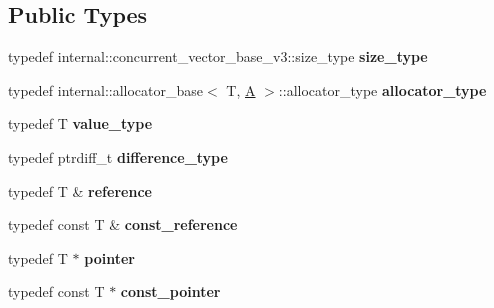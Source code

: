 \subsection*{Public Types}
\begin{DoxyCompactItemize}
\item 
\hypertarget{classtbb_1_1concurrent__vector_a3c7cfa676613fd96c89f2e4c7c8135ea}{}typedef internal\+::concurrent\+\_\+vector\+\_\+base\+\_\+v3\+::size\+\_\+type {\bfseries size\+\_\+type}\label{classtbb_1_1concurrent__vector_a3c7cfa676613fd96c89f2e4c7c8135ea}

\item 
\hypertarget{classtbb_1_1concurrent__vector_a78223f304e2fdb0f6cebcc282a1a1589}{}typedef internal\+::allocator\+\_\+base$<$ T, \hyperlink{structA}{A} $>$\+::allocator\+\_\+type {\bfseries allocator\+\_\+type}\label{classtbb_1_1concurrent__vector_a78223f304e2fdb0f6cebcc282a1a1589}

\item 
\hypertarget{classtbb_1_1concurrent__vector_ab003d639b66a437b93a432dfa8d5019d}{}typedef T {\bfseries value\+\_\+type}\label{classtbb_1_1concurrent__vector_ab003d639b66a437b93a432dfa8d5019d}

\item 
\hypertarget{classtbb_1_1concurrent__vector_a6a98de52958f58ff7519a8ced40ce0b8}{}typedef ptrdiff\+\_\+t {\bfseries difference\+\_\+type}\label{classtbb_1_1concurrent__vector_a6a98de52958f58ff7519a8ced40ce0b8}

\item 
\hypertarget{classtbb_1_1concurrent__vector_a8fa7c28f1260fe6726ec6c845754d429}{}typedef T \& {\bfseries reference}\label{classtbb_1_1concurrent__vector_a8fa7c28f1260fe6726ec6c845754d429}

\item 
\hypertarget{classtbb_1_1concurrent__vector_a32b8a750f2692c1fc5a3d9995400277b}{}typedef const T \& {\bfseries const\+\_\+reference}\label{classtbb_1_1concurrent__vector_a32b8a750f2692c1fc5a3d9995400277b}

\item 
\hypertarget{classtbb_1_1concurrent__vector_a88fd88a03e5ac2e2338107cac6d62272}{}typedef T $\ast$ {\bfseries pointer}\label{classtbb_1_1concurrent__vector_a88fd88a03e5ac2e2338107cac6d62272}

\item 
\hypertarget{classtbb_1_1concurrent__vector_a4aef6c777fe61fb85708f5e276498c6e}{}typedef const T $\ast$ {\bfseries const\+\_\+pointer}\label{classtbb_1_1concurrent__vector_a4aef6c777fe61fb85708f5e276498c6e}


\end{DoxyCompactItemize}

